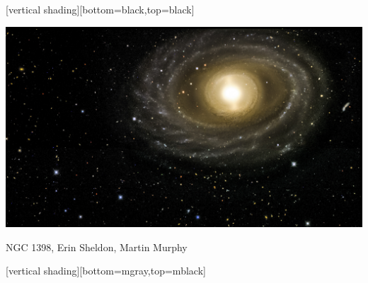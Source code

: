 \documentclass{beamer}
\begin{document}
{
    [vertical shading][bottom=black,top=black]
	
    \frame
    {

        \begin{center}
            \includegraphics[width=1.1\textwidth]{DES-2013-01-medres.jpg}

            {\tiny \hfill NGC 1398, Erin Sheldon, Martin Murphy}
        \end{center}
    }

    [vertical shading][bottom=mgray,top=mblack]

}
\end{document}
